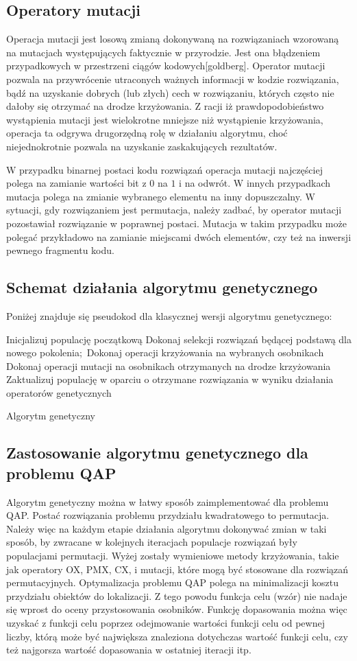 \subsection{Operatory mutacji}
Operacja mutacji jest losową zmianą dokonywaną na rozwiązaniach wzorowaną na mutacjach występujących faktycznie w przyrodzie. Jest ona błądzeniem przypadkowych w przestrzeni ciągów kodowych[goldberg]. Operator mutacji pozwala na przywrócenie utraconych ważnych informacji w kodzie rozwiązania, bądź na uzyskanie dobrych (lub złych) cech w rozwiązaniu, których często nie dałoby się otrzymać na drodze krzyżowania. Z racji iż prawdopodobieństwo wystąpienia mutacji jest wielokrotne mniejsze niż wystąpienie krzyżowania, operacja ta odgrywa drugorzędną rolę w działaniu algorytmu, choć niejednokrotnie pozwala na uzyskanie zaskakujących rezultatów.

W przypadku binarnej postaci kodu rozwiązań operacja mutacji najczęściej polega na zamianie wartości bit z $0$ na $1$ i na odwrót. W innych przypadkach mutacja polega na zmianie wybranego elementu na inny dopuszczalny. W sytuacji, gdy rozwiązaniem jest permutacja, należy zadbać, by operator mutacji pozostawiał rozwiązanie w poprawnej postaci. Mutacja w takim przypadku może polegać przykładowo na zamianie miejscami dwóch elementów, czy też na inwersji pewnego fragmentu kodu. 

\subsection{Schemat działania algorytmu genetycznego}
Poniżej znajduje się pseudokod dla klasycznej wersji algorytmu genetycznego:
\begin{algorithm}[H]
	Inicjalizuj populację początkową\;
 	{
 		Dokonaj selekcji rozwiązań będącej podstawą dla nowego pokolenia;\
 		Dokonaj operacji krzyżowania na wybranych osobnikach\;
 		Dokonaj operacji mutacji na osobnikach otrzymanych na drodze krzyżowania\;
 		Zaktualizuj populację w oparciu o otrzymane rozwiązania w wyniku działania operatorów genetycznych
 	}
 	\caption{Algorytm genetyczny}
\end{algorithm}
\subsection{Zastosowanie algorytmu genetycznego dla problemu QAP}
Algorytm genetyczny można w łatwy sposób zaimplementować dla problemu QAP. Postać rozwiązania problemu przydziału kwadratowego to permutacja. Należy więc na każdym etapie działania algorytmu dokonywać zmian w taki sposób, by zwracane w kolejnych iteracjach populacje rozwiązań były populacjami permutacji. Wyżej zostały wymieniowe metody krzyżowania, takie jak operatory OX, PMX, CX, i mutacji, które mogą być stosowane dla rozwiązań permutacyjnych.
Optymalizacja problemu QAP polega na minimalizacji kosztu przydziału obiektów do lokalizacji. Z tego powodu funkcja celu (wzór) nie nadaje się wprost do oceny przystosowania osobników. Funkcję dopasowania można więc uzyskać z funkcji celu poprzez odejmowanie wartości funkcji celu od pewnej liczby, którą może być największa znaleziona dotychczas wartość funkcji celu, czy też najgorsza wartość dopasowania w ostatniej iteracji itp.